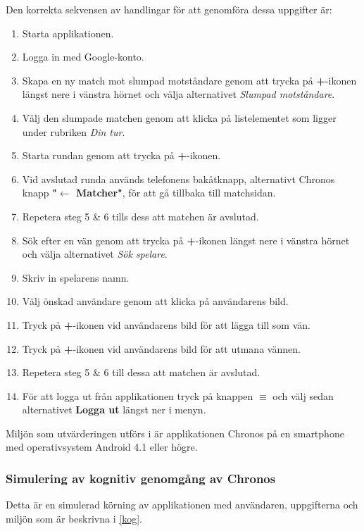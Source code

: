 \documentclass[a4paper, 11pt]{article}
\begin{document}
Den korrekta sekvensen av handlingar för att genomföra dessa uppgifter är:
\begin{enumerate}
\item Starta applikationen.
\item Logga in med Google-konto.
\item Skapa en ny match mot slumpad motståndare genom att trycka på \textbf{+}-ikonen längst nere i vänstra hörnet och välja alternativet \textit{Slumpad motståndare}.
\item Välj den slumpade matchen genom att klicka på listelementet som ligger under rubriken \textit{Din tur}. 
\item Starta rundan genom att trycka på \textbf{+}-ikonen.
\item Vid avslutad runda används telefonens bakåtknapp, alternativt Chronos knapp \textbf{"$\leftarrow$ Matcher"}, för att gå tillbaka till matchsidan.
\item Repetera steg 5 \& 6 tills dess att matchen är avslutad.
\item Sök efter en vän genom att trycka på \textbf{+}-ikonen längst nere i vänstra hörnet och välja alternativet \textit{Sök spelare}.
\item Skriv in spelarens namn.
\item Välj önskad användare genom att klicka på användarens bild.
\item Tryck på \textbf{+}-ikonen vid användarens bild för att lägga till som vän.
\item Tryck på \textbf{+}-ikonen vid användarens bild för att utmana vännen.
\item Repetera steg 5 \& 6 till dessa att matchen är avslutad.
\item För att logga ut från applikationen tryck på knappen \textbf{$\equiv$} och välj sedan alternativet \textbf{Logga ut} längst ner i menyn.
\end{enumerate}

Miljön som utvärderingen utförs i är applikationen Chronos på en smartphone med operativsystem Android 4.1 eller högre.

\subsubsection{Simulering av kognitiv genomgång av Chronos}
Detta är en simulerad körning av applikationen med användaren, uppgifterna och miljön som är beskrivna i \ref{kog}.
\end{document}
